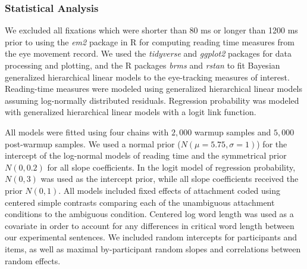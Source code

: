 \documentclass[english, doc]{apa7}\usepackage[]{graphicx}\usepackage[]{color}
\begin{document}
\subsubsection{Statistical Analysis}

We excluded all fixations which were shorter than 80 ms or longer than 1200 ms prior to using the \emph{em2} package \citep{LogacevVasishth:2013} in R \citep{R-base} for computing reading time measures from the eye movement record. We used the \emph{tidyverse} and \emph{ggplot2} packages
\citep{R-tidyverse, R-ggplot2} for data processing and plotting, and the R packages \emph{brms} \citep{R-brms_a} and \emph{rstan} \citep{R-rstan} to fit Bayesian generalized hierarchical linear models \citep[e.g.,][]{GelmanHill:2007, McElreath:2016, Kruschke:2015, VasishthEtAl:2019} to the eye-tracking measures of interest.
Reading-time measures were modeled using generalized hierarchical linear models assuming log-normally distributed residuals. Regression probability was modeled with generalized hierarchical linear models with a logit link function.


All models were fitted using four chains with \(2,000\) warmup samples and \(5,000\) post-warmup samples. We used a normal prior ($N(\mu=5.75, \sigma=1)$) for the intercept of the log-normal models of reading time and the symmetrical prior $N(0, 0.2)$ for all slope coefficients. In the logit model of regression probability, $N(0, 3)$ was used as the intercept prior, while all slope coefficients received the prior $N(0, 1)$. All models included fixed effects of attachment coded using centered simple contrasts comparing each of the unambiguous attachment conditions to the ambiguous condition. Centered log word length was used as a covariate in order to account for any differences in critical word length between our experimental sentences. We included random intercepts for participants and items, as well as maximal by-participant random slopes and correlations between random effects.
\end{document}
